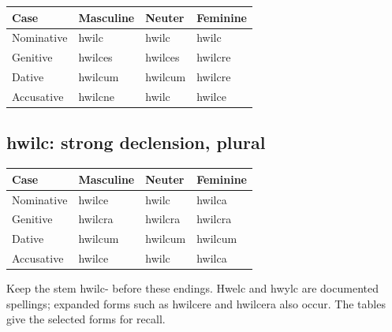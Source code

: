 \par\begingroup
\fontsize{10.5}{13.2}\selectfont
\setlength{\LTleft}{0pt}\setlength{\LTright}{\fill}
\noindent
\begin{tabular}{@{}>{\raggedright\arraybackslash}p{28.89mm}>{\raggedright\arraybackslash}p{28.89mm}>{\raggedright\arraybackslash}p{28.89mm}>{\raggedright\arraybackslash}p{28.89mm}@{}}
\toprule
\textbf{Case} & \textbf{Masculine} & \textbf{Neuter} & \textbf{Feminine} \\
\midrule
Nominative & hwilc & hwilc & hwilc \\
Genitive & hwilces & hwilces & hwilcre \\
Dative & hwilcum & hwilcum & hwilcre \\
Accusative & hwilcne & hwilc & hwilce \\
\bottomrule
\end{tabular}
\par\endgroup

\subsection*{hwilc: strong declension, plural}

\par\begingroup
\fontsize{10.5}{13.2}\selectfont
\setlength{\LTleft}{0pt}\setlength{\LTright}{\fill}
\noindent
\begin{tabular}{@{}>{\raggedright\arraybackslash}p{28.89mm}>{\raggedright\arraybackslash}p{28.89mm}>{\raggedright\arraybackslash}p{28.89mm}>{\raggedright\arraybackslash}p{28.89mm}@{}}
\toprule
\textbf{Case} & \textbf{Masculine} & \textbf{Neuter} & \textbf{Feminine} \\
\midrule
Nominative & hwilce & hwilc & hwilca \\
Genitive & hwilcra & hwilcra & hwilcra \\
Dative & hwilcum & hwilcum & hwilcum \\
Accusative & hwilce & hwilc & hwilca \\
\bottomrule
\end{tabular}
\par\endgroup

Keep the stem hwilc- before these endings. Hwelc and hwylc are documented spellings; expanded forms such as hwilcere and hwilcera also occur. The tables give the selected forms for recall.

